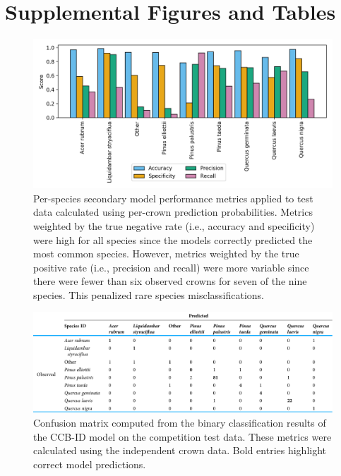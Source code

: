 \chapter{Supplemental Figures and Tables}

\begin{figure}[!ht]
\includegraphics[width=\textwidth]{figures/ch2-performance-continuous.pdf}
\centering
\caption[Per-species secondary model performance metrics applied to test data calculated using per-crown prediction probabilities.]{Per-species secondary model performance metrics applied to test data calculated using per-crown prediction probabilities. Metrics weighted by the true negative rate (i.e., accuracy and specificity) were high for all species since the models correctly predicted the most common species. However, metrics weighted by the true positive rate (i.e., precision and recall) were more variable since there were fewer than six observed crowns for seven of the nine species. This penalized rare species misclassifications.}
\label{fig:performance-continuous}
\end{figure}

\clearpage

\begin{figure}[!ht]
\includegraphics[width=\textwidth]{figures/ch2-confusion-matrix.pdf}
\centering
\caption[Confusion matrix computed from the binary classification results of the CCB-ID model on the competition test data.]{Confusion matrix computed from the binary classification results of the CCB-ID model on the competition test data. These metrics were calculated using the independent crown data.
Bold entries highlight correct model predictions.}
\label{fig:confusion-matrix}
\end{figure}

